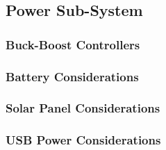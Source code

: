 \subsection{Power Sub-System}
\subsubsection{Buck-Boost Controllers}
\subsubsection{Battery Considerations}
\subsubsection{Solar Panel Considerations}
\subsubsection{USB Power Considerations}
